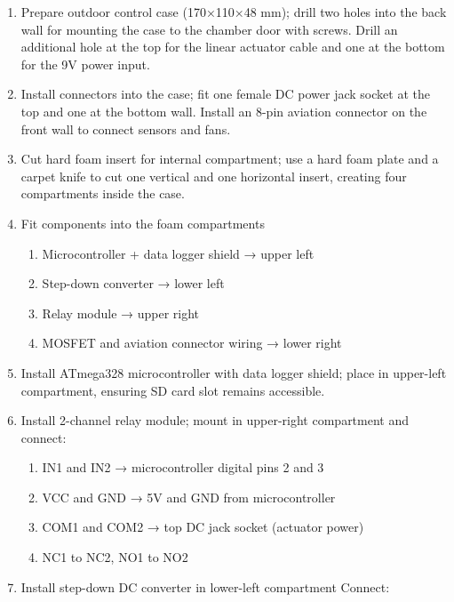 \documentclass[
  11pt,
  letterpaper,
]{book}
\providecommand{\tightlist}{%
  \setlength{\itemsep}{0pt}\setlength{\parskip}{0pt}}
\begin{document}
\begin{enumerate}
\def\labelenumi{\arabic{enumi}.}
\item
  Prepare outdoor control case (170×110×48 mm); drill two holes into the
  back wall for mounting the case to the chamber door with screws. Drill
  an additional hole at the top for the linear actuator cable and one at
  the bottom for the 9V power input.
\item
  Install connectors into the case; fit one female DC power jack socket
  at the top and one at the bottom wall. Install an 8-pin aviation
  connector on the front wall to connect sensors and fans.
\item
  Cut hard foam insert for internal compartment; use a hard foam plate
  and a carpet knife to cut one vertical and one horizontal insert,
  creating four compartments inside the case.
\item
  Fit components into the foam compartments

  \begin{enumerate}
  \def\labelenumii{\alph{enumii}.}
  \tightlist
  \item
    Microcontroller + data logger shield → upper left\\
  \item
    Step-down converter → lower left\\
  \item
    Relay module → upper right\\
  \item
    MOSFET and aviation connector wiring → lower right
  \end{enumerate}
\item
  Install ATmega328 microcontroller with data logger shield; place in
  upper-left compartment, ensuring SD card slot remains accessible.
\item
  Install 2-channel relay module; mount in upper-right compartment and
  connect:

  \begin{enumerate}
  \def\labelenumii{\alph{enumii}.}
  \tightlist
  \item
    IN1 and IN2 → microcontroller digital pins 2 and 3\\
  \item
    VCC and GND → 5V and GND from microcontroller\\
  \item
    COM1 and COM2 → top DC jack socket (actuator power)\\
  \item
    NC1 to NC2, NO1 to NO2
  \end{enumerate}
\item
  Install step-down DC converter in lower-left compartment Connect:


\end{enumerate}
\end{document}
